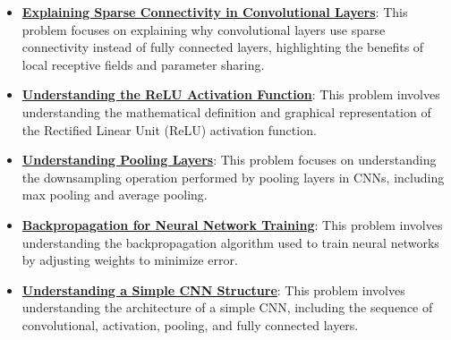 \documentclass{article}%
\begin{document}
\begin{itemize}[leftmargin=*]
\item \href{https://purdue.brightspace.com/d2l/common/assets/pdfjs-d2l-dist/1.0.14-legacy/web/viewer.html?file=%2Fcontent%2Fenforced%2F1095467-wl.202510.CS.24300.001%2F09L1-cnn.pdf%3Fou%3D1095467&lang=en-us&container=d2l-fileviewer-rendered-pdf&fullscreen=d2l-fileviewer-rendered-pdf-dialog&height=667#page=10}{\textbf{Explaining Sparse Connectivity in Convolutional Layers}}: This problem focuses on explaining why convolutional layers use sparse connectivity instead of fully connected layers, highlighting the benefits of local receptive fields and parameter sharing.%
\item \href{https://purdue.brightspace.com/d2l/common/assets/pdfjs-d2l-dist/1.0.14-legacy/web/viewer.html?file=%2Fcontent%2Fenforced%2F1095467-wl.202510.CS.24300.001%2F09L1-cnn.pdf%3Fou%3D1095467&lang=en-us&container=d2l-fileviewer-rendered-pdf&fullscreen=d2l-fileviewer-rendered-pdf-dialog&height=667#page=13}{\textbf{Understanding the ReLU Activation Function}}: This problem involves understanding the mathematical definition and graphical representation of the Rectified Linear Unit (ReLU) activation function.%
\item \href{https://purdue.brightspace.com/d2l/common/assets/pdfjs-d2l-dist/1.0.14-legacy/web/viewer.html?file=%2Fcontent%2Fenforced%2F1095467-wl.202510.CS.24300.001%2F09L1-cnn.pdf%3Fou%3D1095467&lang=en-us&container=d2l-fileviewer-rendered-pdf&fullscreen=d2l-fileviewer-rendered-pdf-dialog&height=667#page=14}{\textbf{Understanding Pooling Layers}}: This problem focuses on understanding the downsampling operation performed by pooling layers in CNNs, including max pooling and average pooling.%
\item \href{https://purdue.brightspace.com/d2l/common/assets/pdfjs-d2l-dist/1.0.14-legacy/web/viewer.html?file=%2Fcontent%2Fenforced%2F1095467-wl.202510.CS.24300.001%2F09L1-cnn.pdf%3Fou%3D1095467&lang=en-us&container=d2l-fileviewer-rendered-pdf&fullscreen=d2l-fileviewer-rendered-pdf-dialog&height=667#page=16}{\textbf{Backpropagation for Neural Network Training}}: This problem involves understanding the backpropagation algorithm used to train neural networks by adjusting weights to minimize error.%
\item \href{https://purdue.brightspace.com/d2l/common/assets/pdfjs-d2l-dist/1.0.14-legacy/web/viewer.html?file=%2Fcontent%2Fenforced%2F1095467-wl.202510.CS.24300.001%2F09L1-cnn.pdf%3Fou%3D1095467&lang=en-us&container=d2l-fileviewer-rendered-pdf&fullscreen=d2l-fileviewer-rendered-pdf-dialog&height=667#page=17}{\textbf{Understanding a Simple CNN Structure}}: This problem involves understanding the architecture of a simple CNN, including the sequence of convolutional, activation, pooling, and fully connected layers.%

\end{itemize}
\end{document}
